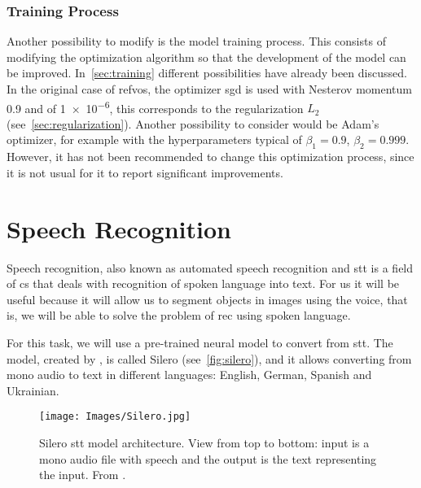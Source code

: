 \subsubsection{Training Process}

Another possibility to modify is the model training process. This consists of
modifying the optimization algorithm so that the development of the model can
be improved. In\ \vref{sec:training} different possibilities have already been
discussed. In the original case of \gls{refvos}, the optimizer \gls{sgd} is
used with Nesterov momentum \num{0.9} and
 of \num{1e-6}, this corresponds to the regularization
\(L_2\) (see\ \vref{sec:regularization}). Another possibility to consider would
be Adam's optimizer, for example with the
hyperparameters typical of \(\beta_1 = 0.9\),
\(\beta_2 = 0.999\). However, it has not been recommended to change this
optimization process, since it is not usual for it to report significant
improvements.



\section{Speech Recognition}%
\label{sec:speech}

Speech recognition, also known as automated speech recognition and \gls{stt} is
a field of \gls{cs} that deals with recognition of spoken language into
text. For us it will be useful because it will allow us to segment objects in
images using the voice, that is, we will be able to solve the problem of
\gls{rec} using spoken language.

For this task, we will use a pre-trained neural model to convert from
\gls{stt}. The model, created by
, is called Silero (see\
\vref{fig:silero}), and it allows converting from mono audio to text in
different languages: English, German, Spanish and Ukrainian.

\begin{figure}[p]
  \centering
  \texttt{[image: Images/Silero.jpg]}
  \caption[Silero  model architecture]{Silero \acf{stt} model
    architecture. View from top to bottom: input is a mono audio file with
    speech and the output is the text representing the input. From
    \figcite{veysov20:towar_imagen_momen_speec_text}.}%
  \label{fig:silero}
\end{figure}

